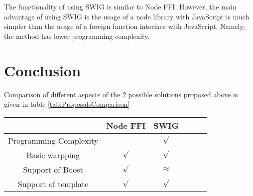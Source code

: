 The functionality of using SWIG is similar to Node FFI. However, the main advantage of using SWIG is the usage of a node library with JavaScript is much simpler than the usage of a foreign function interface with JavaScript. Namely, the method has lower programming complexity. 

\section{Conclusion}
Comparison of different aspects of the 2 possible solutions proposed above is given in table  \ref{tab:ProposalsComparison}

\begin{table*} %
    \begin{center}
        \begin{tabular}{c|ccccc}
                                     & Node FFI & SWIG  \\
            \hline
            Programming Complexity   &          &$\surd$ \\  
            
            Basic warpping           &  $\surd$  &$\surd$ \\ 
            
            Support of Boost         & $\surd$  &$\approx$\\
            
            Support of template      &  $\surd$  &$\surd$ \\
                        

             
        \end{tabular}
    \end{center}
    \caption{Comparison of various proposals}
    \label{tab:ProposalsComparison}
\end{table*}

\begin{comment}
If too many ideas have been enumerated and none can be totally and formally demonstrated to be the best, then some choice has probably to bemade in order to limit the time-consuming experiments that follow.  It is preferable to achieve a few well-conducted experiments that will provide unquestionable conclusions though in a limited scope.
\end{comment}



